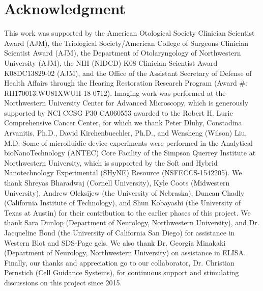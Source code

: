 \documentclass[review]{elsarticle}
\begin{document}
\section* {Acknowledgment}	
This work was supported by the American Otological Society Clinician Scientist Award (AJM), the Triological Society/American College of Surgeons Clinician Scientist Award (AJM), the Department of Otolaryngology of Northwestern University (AJM), the NIH (NIDCD) K08 Clinician Scientist Award K08DC13829-02 (AJM), and the Office of the Assistant Secretary of Defense of Health Affairs through the Hearing Restoration Research Program (Award \#: RH170013:WU81XWUH-18-0712). Imaging work was performed at the Northwestern University Center for Advanced Microscopy, which is generously supported by NCI CCSG P30 CA060553 awarded to the Robert H. Lurie Comprehensive Cancer Center, for which we thank Peter Dluhy, Constadina Arvanitis, Ph.D., David Kirchenbuechler, Ph.D., and Wensheng (Wilson) Liu, M.D.  Some of microfluidic device experiments were performed in the Analytical bioNanoTechnology (ANTEC) Core Facility of the Simpson Querrey Institute at Northwestern University, which is supported by the Soft and Hybrid Nanotechnology Experimental (SHyNE) Resource (NSFECCS-1542205). We thank Shreyas Bharadwaj (Cornell University), Kyle Coots (Midwestern University), Andrew Oleksijew (the University of Nebraska), Duncan Chadly (California Institute of Technology), and Shun Kobayashi (the University of Texas at Austin) for their contribution to the earlier phases of this project. We thank Sara Dunlop (Department of Neurology, Northwestern University), and Dr. Jacqueline Bond (the University of California San Diego) for assistance in Western Blot and SDS-Page gels. We also thank Dr. Georgia Minakaki (Department of Neurology, Northwestern University) on assistance in ELISA. Finally, our thanks and appreciation go to our collaborator, Dr. Christian Pernstich (Cell Guidance Systems), for continuous support and stimulating discussions on this project since 2015. 





\end{document}
